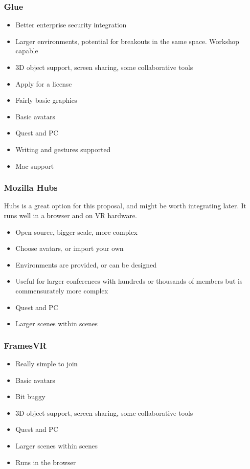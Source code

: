 \subsubsection{Glue}
\begin{itemize}
\item Better enterprise security integration
\item Larger environments, potential for breakouts in the same space. Workshop capable
\item 3D object support, screen sharing, some collaborative tools
\item Apply for a license
\item Fairly basic graphics
\item Basic avatars
\item Quest and PC
\item Writing and gestures supported
\item Mac support
\end{itemize}
\subsubsection{Mozilla Hubs}
Hubs is a great option for this proposal, and might be worth integrating later. It runs well in a browser and on VR hardware.
\begin{itemize}
\item Open source, bigger scale, more complex
\item Choose avatars, or import your own
\item Environments are provided, or can be designed
\item Useful for larger conferences with hundreds or thousands of members but is commensurately more complex
\item Quest and PC
\item Larger scenes within scenes
\end{itemize}
\subsubsection{FramesVR}
\begin{itemize}
\item Really simple to join
\item Basic avatars
\item Bit buggy
\item 3D object support, screen sharing, some collaborative tools
\item Quest and PC
\item Larger scenes within scenes
\item Runs in the browser
\end{itemize}

